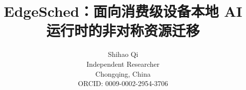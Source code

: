 \documentclass[UTF8,fontset=none]{ctexart}
\begin{document}
\title{EdgeSched：面向消费级设备本地 AI 运行时的非对称资源迁移}

\author{Shihao Qi\\Independent Researcher\\Chongqing, China\\ORCID: 0009-0002-2954-3706}
\date{}

\maketitle












\end{document}
